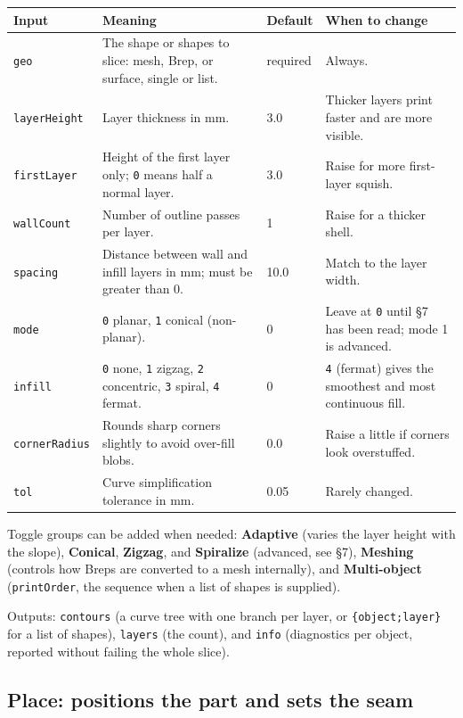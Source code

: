 \documentclass[11pt]{article}
\newcommand{\param}[1]{\texttt{#1}}
\begin{document}
\begin{longtable}{@{}p{2.6cm}p{3.6cm}p{1.6cm}p{4.6cm}@{}}
\toprule
\textbf{Input} & \textbf{Meaning} & \textbf{Default} & \textbf{When to change} \\
\midrule
\endhead
\param{geo} & The shape or shapes to slice: mesh, Brep, or surface, single or list. & required & Always. \\
\param{layerHeight} & Layer thickness in mm. & 3.0 & Thicker layers print faster and are more visible. \\
\param{firstLayer} & Height of the first layer only; \param{0} means half a normal layer. & 3.0 & Raise for more first-layer squish. \\
\param{wallCount} & Number of outline passes per layer. & 1 & Raise for a thicker shell. \\
\param{spacing} & Distance between wall and infill layers in mm; must be greater than 0. & 10.0 & Match to the layer width. \\
\param{mode} & \param{0} planar, \param{1} conical (non-planar). & 0 & Leave at \param{0} until \S 7 has been read; mode 1 is advanced. \\
\param{infill} & \param{0} none, \param{1} zigzag, \param{2} concentric, \param{3} spiral, \param{4} fermat. & 0 & \param{4} (fermat) gives the smoothest and most continuous fill. \\
\param{cornerRadius} & Rounds sharp corners slightly to avoid over-fill blobs. & 0.0 & Raise a little if corners look overstuffed. \\
\param{tol} & Curve simplification tolerance in mm. & 0.05 & Rarely changed. \\
\bottomrule
\end{longtable}

Toggle groups can be added when needed: \textbf{Adaptive} (varies the
layer height with the slope), \textbf{Conical}, \textbf{Zigzag}, and
\textbf{Spiralize} (advanced, see \S 7), \textbf{Meshing} (controls how
Breps are converted to a mesh internally), and \textbf{Multi-object}
(\param{printOrder}, the sequence when a list of shapes is supplied).

Outputs: \param{contours} (a curve tree with one branch per layer, or
\param{\{object;layer\}} for a list of shapes), \param{layers} (the
count), and \param{info} (diagnostics per object, reported without
failing the whole slice).

\subsection{Place: positions the part and sets the seam}
\end{document}
